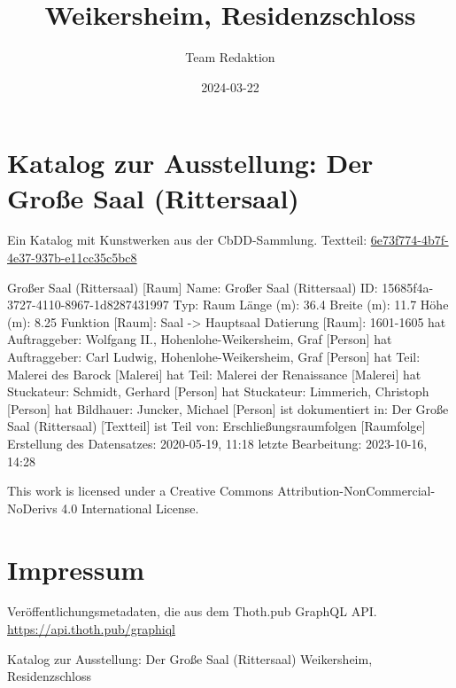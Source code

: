 \documentclass[
  letterpaper,
]{book}
\title{Weikersheim, Residenzschloss}
\author{Team Redaktion}
\date{2024-03-22}
\renewcommand*\contentsname{Table of contents}
\newcommand\contentsname{Table of contents}
\begin{document}
\frontmatter
\maketitle

\renewcommand*\contentsname{Table of contents}
{
\setcounter{tocdepth}{2}
\tableofcontents
}

\mainmatter
{}

\chapter{Katalog zur Ausstellung: Der Große Saal
(Rittersaal)}\label{katalog-zur-ausstellung-der-grouxdfe-saal-rittersaal}

Ein Katalog mit Kunstwerken aus der CbDD-Sammlung. Textteil:
\href{https://www.deckenmalerei.eu/42d06165-58e7-4653-bfe4-3d5f7091fc33\#6e73f774-4b7f-4e37-937b-e11cc35c5bc8}{6e73f774-4b7f-4e37-937b-e11cc35c5bc8}

Großer Saal (Rittersaal) {[}Raum{]} Name: Großer Saal (Rittersaal) ID:
15685f4a-3727-4110-8967-1d8287431997 Typ: Raum Länge (m): 36.4 Breite
(m): 11.7 Höhe (m): 8.25 Funktion {[}Raum{]}: Saal -\textgreater{}
Hauptsaal Datierung {[}Raum{]}: 1601-1605 hat Auftraggeber: Wolfgang
II., Hohenlohe-Weikersheim, Graf {[}Person{]} hat Auftraggeber: Carl
Ludwig, Hohenlohe-Weikersheim, Graf {[}Person{]} hat Teil: Malerei des
Barock {[}Malerei{]} hat Teil: Malerei der Renaissance {[}Malerei{]} hat
Stuckateur: Schmidt, Gerhard {[}Person{]} hat Stuckateur: Limmerich,
Christoph {[}Person{]} hat Bildhauer: Juncker, Michael {[}Person{]} ist
dokumentiert in: Der Große Saal (Rittersaal) {[}Textteil{]} ist Teil
von: Erschließungsraumfolgen {[}Raumfolge{]} Erstellung des Datensatzes:
2020-05-19, 11:18 letzte Bearbeitung: 2023-10-16, 14:28

This work is licensed under a Creative Commons
Attribution-NonCommercial-NoDerivs 4.0 International License.


\chapter{Impressum}\label{impressum}

Veröffentlichungsmetadaten, die aus dem Thoth.pub GraphQL API.
\url{https://api.thoth.pub/graphiql}

Katalog zur Ausstellung: Der Große Saal (Rittersaal) Weikersheim,
Residenzschloss
\end{document}
